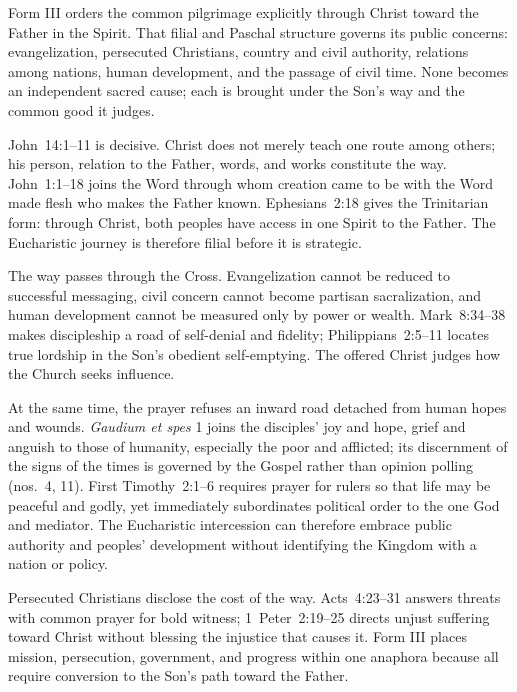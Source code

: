 Form III orders the common pilgrimage explicitly through Christ toward the Father in the Spirit. That filial and Paschal structure governs its public concerns: evangelization, persecuted Christians, country and civil authority, relations among nations, human development, and the passage of civil time. None becomes an independent sacred cause; each is brought under the Son's way and the common good it judges.

John~14:1--11 is decisive. Christ does not merely teach one route among others; his person, relation to the Father, words, and works constitute the way. John~1:1--18 joins the Word through whom creation came to be with the Word made flesh who makes the Father known. Ephesians~2:18 gives the Trinitarian form: through Christ, both peoples have access in one Spirit to the Father. The Eucharistic journey is therefore filial before it is strategic.

The way passes through the Cross. Evangelization cannot be reduced to successful messaging, civil concern cannot become partisan sacralization, and human development cannot be measured only by power or wealth. Mark~8:34--38 makes discipleship a road of self-denial and fidelity; Philippians~2:5--11 locates true lordship in the Son's obedient self-emptying. The offered Christ judges how the Church seeks influence.

At the same time, the prayer refuses an inward road detached from human hopes and wounds. \emph{Gaudium et spes} 1 joins the disciples' joy and hope, grief and anguish to those of humanity, especially the poor and afflicted; its discernment of the signs of the times is governed by the Gospel rather than opinion polling (nos.~4, 11). First Timothy~2:1--6 requires prayer for rulers so that life may be peaceful and godly, yet immediately subordinates political order to the one God and mediator. The Eucharistic intercession can therefore embrace public authority and peoples' development without identifying the Kingdom with a nation or policy.

Persecuted Christians disclose the cost of the way. Acts~4:23--31 answers threats with common prayer for bold witness; 1~Peter~2:19--25 directs unjust suffering toward Christ without blessing the injustice that causes it. Form III places mission, persecution, government, and progress within one anaphora because all require conversion to the Son's path toward the Father.


